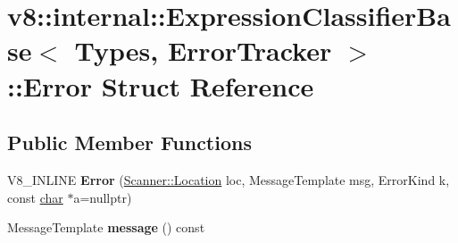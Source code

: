 \hypertarget{structv8_1_1internal_1_1ExpressionClassifierBase_1_1Error}{}\section{v8\+:\+:internal\+:\+:Expression\+Classifier\+Base$<$ Types, Error\+Tracker $>$\+:\+:Error Struct Reference}
\label{structv8_1_1internal_1_1ExpressionClassifierBase_1_1Error}
\subsection*{Public Member Functions}
\begin{DoxyCompactItemize}
\item 
\mbox{\label{structv8_1_1internal_1_1ExpressionClassifierBase_1_1Error_a72889d6553d40d6221969fb7fb2d0576}} 
V8\+\_\+\+I\+N\+L\+I\+NE {\bfseries Error} (\mbox{\hyperlink{structv8_1_1internal_1_1Scanner_1_1Location}{Scanner\+::\+Location}} loc, Message\+Template msg, Error\+Kind k, const \mbox{\hyperlink{classchar}{char}} $\ast$a=nullptr)
\item 
\mbox{\label{structv8_1_1internal_1_1ExpressionClassifierBase_1_1Error_a03d277aed230d8fd1d3095fa48389ebe}} 
Message\+Template {\bfseries message} () const
\end{DoxyCompactItemize}
